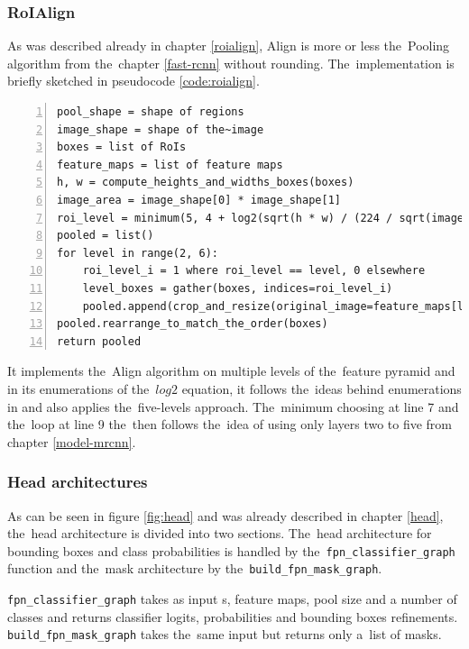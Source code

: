 \subsubsection{RoIAlign}
\label{model-roi}

As was described already in chapter \ref{roialign}, Align is more or 
less the~Pooling algorithm from the~chapter \ref{fast-rcnn} without 
rounding. The~implementation is briefly sketched in pseudocode 
\ref{code:roialign}.

{\scriptsize
\begin{lstlisting}[style=python, caption={RoIAlign}, captionpos=b, 
label=code:roialign, deletekeywords={from, input, map},
backgroundcolor = \color{light-gray}, numbers=left, breaklines=true]
pool_shape = shape of regions
image_shape = shape of the~image
boxes = list of RoIs
feature_maps = list of feature maps
h, w = compute_heights_and_widths_boxes(boxes)
image_area = image_shape[0] * image_shape[1]
roi_level = minimum(5, 4 + log2(sqrt(h * w) / (224 / sqrt(image_area))))
pooled = list()
for level in range(2, 6):
    roi_level_i = 1 where roi_level == level, 0 elsewhere
    level_boxes = gather(boxes, indices=roi_level_i)
    pooled.append(crop_and_resize(original_image=feature_maps[level-2], what_process=level_boxes, shape=pool_shape, method='bilinear'))
pooled.rearrange_to_match_the_order(boxes)
return pooled
\end{lstlisting}}

It implements the~Align algorithm on multiple levels of the~feature 
pyramid and in its enumerations of the~$log2$ equation, it follows the~ideas 
behind enumerations in \cite{fpn} and also applies the~five-levels approach.
The~minimum choosing at line 7 and the~loop at line 9 the~then follows the~idea of 
using only layers two to five from chapter \ref{model-mrcnn}.

\subsubsection{Head architectures}
\label{model-head}

As can be seen in figure \ref{fig:head} and was already described in chapter 
\ref{head}, the~head architecture is divided into two sections. The~head 
architecture for bounding boxes and class probabilities is handled by
the~\verb|fpn_classifier_graph| function and the~mask architecture by
the~\verb|build_fpn_mask_graph|.

\verb|fpn_classifier_graph| takes as input s, feature maps, pool size 
and a number of classes and returns classifier logits, probabilities and bounding 
boxes refinements. \verb|build_fpn_mask_graph| takes the~same input but returns 
only a~list of masks.

